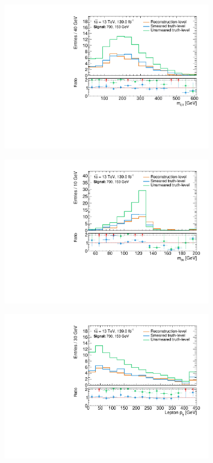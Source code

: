 \begin{figure}
\begin{subfigure}[b]{0.47\linewidth}
		\centering\includegraphics[width=\textwidth]{20210324/700_150/mct_C1N2_Wh_hbb_700p0_150p0_smeared.pdf}
	\end{subfigure}\hfill
	\begin{subfigure}[b]{0.47\linewidth}
		\centering\includegraphics[width=\textwidth]{20210324/700_150/mbb_C1N2_Wh_hbb_700p0_150p0_smeared.pdf}
	\end{subfigure}\hfill
	\begin{subfigure}[b]{0.47\linewidth}
		\centering\includegraphics[width=\textwidth]{20210324/700_150/lep1Pt_C1N2_Wh_hbb_700p0_150p0_smeared.pdf}

\end{subfigure}
\end{figure}
